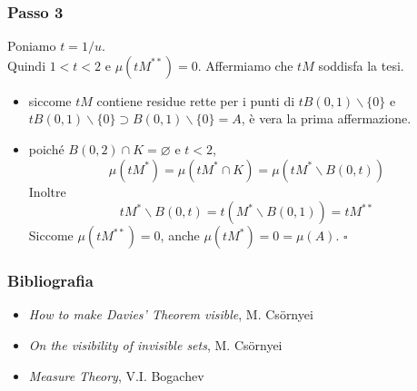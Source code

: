 \documentclass[11pt]{beamer} %
\newcommand{\<}{\langle}
\renewcommand{\>}{\rangle}
\theoremstyle{theorem}
\theoremstyle{theorem}
\theoremstyle{theorem}
\theoremstyle{theorem}
\theoremstyle{theorem}
\begin{document}
\begin{frame}
\frametitle{Passo 3}
Poniamo $t=1 / u$.\\ 
Quindi $1<t<2$ e $\mu\left(t M^{* *}\right)=0$. Affermiamo che $t M$ soddisfa la tesi.\\ \pause
\begin{itemize}
	\item siccome $t M$ contiene residue rette per i punti di $t B(0,1) \backslash\{0\}$ e $t B(0,1) \backslash\{0\} \supset B(0,1) \backslash\{0\}=A$, è vera la prima affermazione.\\ \pause
	\item poiché $B(0,2) \cap K=\varnothing$ e $t<2$,
	$$ \mu\left(t M^{*}\right)=\mu\left(t M^{*} \cap K\right)=\mu\left(t M^{*} \backslash B(0, t)\right) $$
	Inoltre
	$$ t M^{*} \backslash B(0, t)=t\left(M^{*} \backslash B(0,1)\right)=t M^{* *} $$
	Siccome $\mu\left(t M^{* *}\right)=0$, anche $\mu (tM^*)= 0= \mu(A)$. \quad \quad \qquad \qquad $\square$
\end{itemize}
\end{frame}

\begin{frame}
	\frametitle{Bibliografia}
	
	\begin{itemize}
		\item \emph{How to make Davies' Theorem visible}, M. Cs{\"o}rnyei
		\item \emph{On the visibility of invisible sets}, M. Cs{\"o}rnyei
		\item \emph{Measure Theory}, V.I. Bogachev\\
		\end{itemize}	
	
	\medskip
	\begin{center}
	\end{center}
\end{frame}
\end{document}
